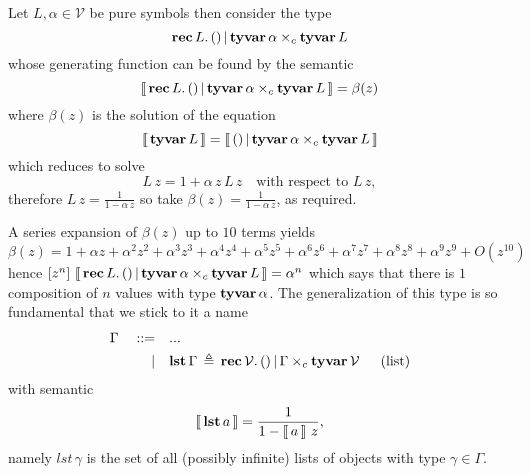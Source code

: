 \begin{example}
Let $L,\alpha\in\mathcal{V}$ be pure symbols then consider the type
\begin{displaymath}
    \textbf{rec}\,L.\,()\,|\,\textbf{tyvar}\,\alpha\times_{c}\textbf{tyvar}\,L
\end{displaymath}
whose generating function can be found by the semantic
\begin{displaymath}
    \left\llbracket\,\textbf{rec}\,L.\,()\,|\,\textbf{tyvar}\,\alpha\times_{c}\textbf{tyvar}\,L\,\right\rrbracket = \beta(z)
\end{displaymath}
where $\beta(z)$ is the solution of the equation 
\begin{displaymath}
    \left\llbracket\,\textbf{tyvar}\,L\,\right\rrbracket = \left\llbracket\,()\,|\,\textbf{tyvar}\,\alpha\times_{c}\textbf{tyvar}\,L\,\right\rrbracket
\end{displaymath}
which reduces to solve
\begin{displaymath}
    L\,z = 1 + \alpha\,z\,L\,z\quad\text{with respect to $L\,z$}, 
\end{displaymath}
therefore $\displaystyle L\,z = \frac{1}{1 - \alpha\,z}$
so take $\displaystyle \beta(z) = \frac{1}{1 - \alpha\,z}$, as required.

A series expansion of $\beta(z)$ up to $10$ terms yields
\begin{displaymath}
\beta(z) = 1 + \alpha z + \alpha^{2} z^{2} + \alpha^{3} z^{3} + \alpha^{4} z^{4} + \alpha^{5} z^{5} + \alpha^{6} z^{6} + \alpha^{7} z^{7} + \alpha^{8} z^{8} + \alpha^{9} z^{9} + O\left(z^{10}\right)
\end{displaymath}
hence $[z^{n}]\,\left\llbracket\,\textbf{rec}\,L.\,()\,|\,\textbf{tyvar}\,\alpha\times_{c}\textbf{tyvar}\,L\,\right\rrbracket =
\alpha^{n}$ which says that there is $1$ composition of $n$ values with type
$\textbf{tyvar}\,\alpha$.  The generalization of this type is so fundamental that we
stick to it a name
\begin{displaymath}
\begin{split}
    \Gamma\quad::=\quad&... \\
           |\quad&\lst{\Gamma}\,\triangleq\,\rec{\mathcal{V}}{()\,|\,\Gamma\times_{c}\tyvar{\mathcal{V}}}\indent\text{(list)}
\end{split}
\end{displaymath}
with semantic
\begin{displaymath}
    \left\llbracket\,\textbf{lst}\,a\,\right\rrbracket = \frac{1}{1-\left\llbracket\,a\,\right\rrbracket\,z},
\end{displaymath}
namely $lst\,\gamma$ is the set of all (possibly infinite) lists of
objects with type $\gamma\in\Gamma$.
\end{example}


